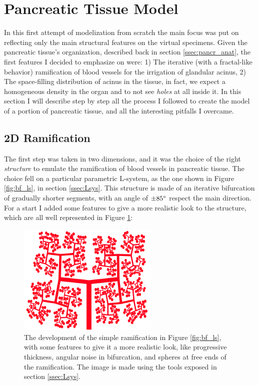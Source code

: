 \section{Pancreatic Tissue Model} \label{ssec:panc_tis_mod}
 In this first attempt of modelization from scratch the main focus was put on reflecting only the main structural features on the virtual specimens. Given the pancreatic tissue's organization, described back in section \ref{ssec:pancr_anat}, the first features I decided to emphasize on were: 1) The iterative (with a fractal-like behavior) ramification of blood vessels for the irrigation of glandular acinus, 2) The space-filling distribution of acinus in the tissue, in fact, we expect a homogeneous density in the organ and to not see \textit{holes} at all inside it. In this section I will describe step by step all the process I followed to create the model of a portion of pancreatic tissue, and all the interesting pitfalls I overcame.

\subsection{2D Ramification}
    The first step was taken in two dimensions, and it was the choice of the right \textit{structure} to emulate the ramification of blood vessels in pancreatic tissue. The choice fell on a particular parametric L-system, as the one shown in Figure \ref{fig:bf_ls}, in section \ref{ssec:Lsys}. This structure is made of an iterative bifurcation of gradually shorter segments, with an angle of $\pm 85 \degree$ respect the main direction. For a start I added some features to give a more realistic look to the structure, which are all well represented in Figure \ref{fig:ram_feat}:

    \begin{figure}
        \centering
        \includegraphics[width = 0.6\textwidth]{images/ram_feat}
        \caption{The development of the simple ramification in Figure \ref{fig:bf_ls}, with some features to give it a more realistic look, like progressive thickness, angular noise in bifurcation, and spheres at free ends of the ramification. The image is made using the tools exposed in section \ref{ssec:Lsys}.}
        \label{fig:ram_feat}
    \end{figure}


